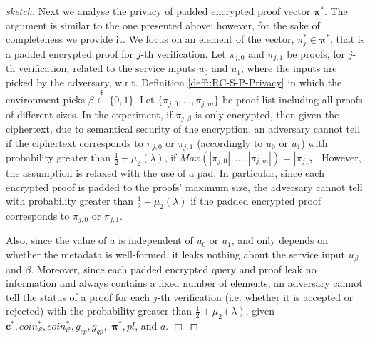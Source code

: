 \begin{proof}[sketch]
Next we analyse the privacy of padded encrypted proof vector $\bm{\pi}^{\scriptscriptstyle *}$. The argument is similar to the one presented above; however, for  the sake of completeness we provide it.  We focus on an element of the vector,  $\pi_{\scriptscriptstyle j}^{\scriptscriptstyle *}\in\bm{\pi}^{\scriptscriptstyle *}$, that is a padded encrypted proof for $j$-th verification. Let $\pi_{\scriptscriptstyle j,0}$ and $\pi_{\scriptscriptstyle j,1}$  be proofs, for $j$-th verification, related to the service inputs $u_{\scriptscriptstyle 0}$ and $u_{\scriptscriptstyle 1}$, where the inputs   are picked by the adversary, w.r.t. Definition  \ref{deff::RC-S-P-Privacy} in which  the environment picks $\beta\stackrel{\scriptscriptstyle\$}\leftarrow \{0,1\}$.  Let $\{\pi_{\scriptscriptstyle j,0},...,\pi_{\scriptscriptstyle j,m}\}$ be proof list including all proofs of different sizes. In the experiment, if $\pi_{\scriptscriptstyle j,\beta}$  is only   encrypted, then given the ciphertext, due to semantical security of the encryption, an adversary cannot tell if the ciphertext corresponds to $\pi_{\scriptscriptstyle j,0}$ or $\pi_{\scriptscriptstyle j,1}$  (accordingly to $u_{\scriptscriptstyle 0}$ or $u_{\scriptscriptstyle 1}$) with probability greater than $\frac{1}{2}+\mu_{\scriptscriptstyle 2}(\lambda)$,  if $Max(|\pi_{\scriptscriptstyle j,0}|,...,|\pi_{\scriptscriptstyle j,m}|)=|\pi_{\scriptscriptstyle j,\beta}|$. However, the  assumption is  relaxed with the use of a pad. In particular, since each encrypted proof is padded  to the proofs' maximum size, the adversary cannot tell with probability greater than $\frac{1}{2}+\mu_{\scriptscriptstyle 2}(\lambda)$ if the  padded encrypted proof corresponds to  $\pi_{\scriptscriptstyle j,0}$ or $\pi_{\scriptscriptstyle j,1}$. 


Also, since the value of $a$ is independent of $u_{\scriptscriptstyle 0}$  or $u_{\scriptscriptstyle 1}$, and only depends on whether the metadata is well-formed, it leaks nothing about the service input $u_{\scriptscriptstyle\beta}$ and $\beta$. Moreover, since each padded encrypted query and proof leak no information and always contains a fixed number of elements, an adversary cannot tell the status of a proof for each $j$-th verification (i.e. whether it is accepted or rejected) with the probability greater than $\frac{1}{2}+\mu_{\scriptscriptstyle 2}(\lambda)$, given  $\bm{c}^{\scriptscriptstyle *},coin^{\scriptscriptstyle *}_{\scriptscriptstyle \mathcal S},coin^{\scriptscriptstyle *}_{\scriptscriptstyle\mathcal C}, g_{\scriptscriptstyle cp},  g_{\scriptscriptstyle qp},$  $\bm{\pi}^{\scriptscriptstyle *},pl$, and $a$.
  \hfill\(\Box\)\end{proof}


